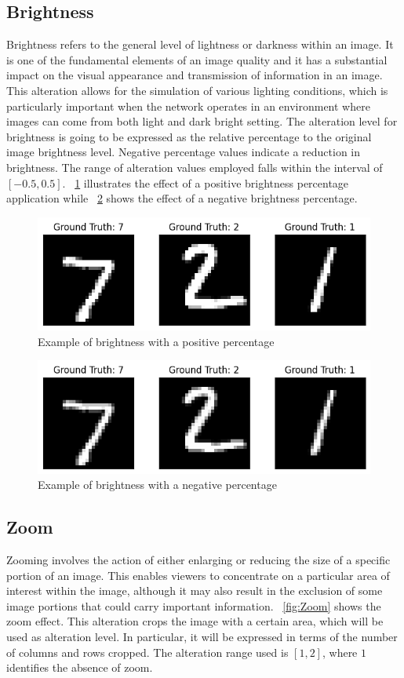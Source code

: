 \subsection{Brightness}

Brightness refers to the general level of lightness or darkness within an image. It is one of the fundamental elements of an image quality and it has a substantial impact on the visual appearance and transmission of information in an image. This alteration allows for the simulation of various lighting conditions, which is particularly important when the network operates in an environment where images can come from both light and dark bright setting. The alteration level for brightness is going to be expressed as the relative percentage to the original image brightness level. Negative percentage values indicate a reduction in brightness. The range of alteration values employed falls within the interval of $[-0.5, 0.5]$. \Fig~\ref{fig:Brightness} illustrates the effect of a positive brightness percentage application while \Fig~\ref{fig:Brightness_neg} shows the effect of a negative brightness percentage.

\begin{figure}[h]
	\centering
	\includegraphics[width=0.6\linewidth]{ImageFiles/Alterations/Brightness}
	\caption{Example of brightness with a positive percentage}
	\label{fig:Brightness}
\end{figure}

\begin{figure}[h]
	\centering
	\includegraphics[width=0.6\linewidth]{ImageFiles/Alterations/Brightness_neg}
	\caption{Example of brightness with a negative percentage}
	\label{fig:Brightness_neg}
\end{figure}

\subsection{Zoom}
Zooming involves the action of either enlarging or reducing the size of a specific portion of an image. This enables viewers to concentrate on a particular area of interest within the image, although it may also result in the exclusion of some image portions that could carry important information. \Fig~\ref{fig:Zoom} shows the zoom effect. This alteration crops the image with a certain area, which will be used as alteration level. In particular, it will be expressed in terms of the number of columns and rows cropped. The alteration range used is $[1,2]$, where $1$ identifies the absence of zoom.

